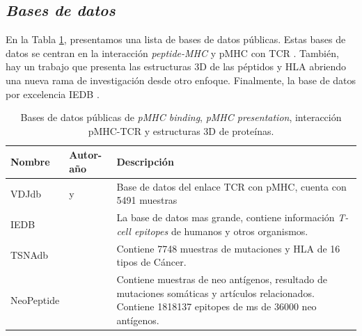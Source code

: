 \subsection{\textit{Bases de datos}}

En la Tabla \ref{tab:bd}, presentamos una lista de bases de datos públicas. Estas bases de datos se centran en la interacción \textit{peptide-MHC} \citep{wu2018tsnadb, zhou2019neopeptide, tan2020dbpepneo, lu2022dbpepneo2} y pMHC con TCR \citep{shugay2018vdjdb, bagaev2020vdjdb}. También, hay un trabajo que presenta las estructuras 3D de las péptidos y HLA abriendo una nueva rama de investigación desde otro enfoque. Finalmente, la base de datos por excelencia IEDB \citep{vita2019immune}.



\begin{table}[H]
	\caption{Bases de datos públicas de \textit{pMHC binding}, \textit{pMHC presentation}, interacción pMHC-TCR y estructuras 3D de proteínas.}
	\label{tab:bd}
	\begin{tabular}{lp{3cm}p{8cm}}
		\textbf{Nombre} & \textbf{Autor-año}                                                                & \textbf{Descripción}                                                                                                                                                                                      \\ \hline
		VDJdb           & \cite{shugay2018vdjdb} y \cite{bagaev2020vdjdb}& Base de datos del enlace TCR con pMHC, cuenta con 5491 muestras                                                                                                                                           \\
		IEDB            & \cite{vita2019immune}                                           & La base de datos mas grande, contiene información \textit{T-cell epitopes} de humanos y otros organismos.                                                                                                          \\
		TSNAdb          & \cite{wu2018tsnadb}                                             & Contiene 7748 muestras de mutaciones y HLA de 16 tipos de Cáncer.                                                                                                                                         \\
		NeoPeptide      & \cite{zhou2019neopeptide}                                       & Contiene muestras de neo antígenos, resultado de mutaciones somáticas y artículos relacionados. Contiene 1818137 epitopes de ms de 36000 neo antígenos.                                                   \\

\end{tabular}
\end{table}
